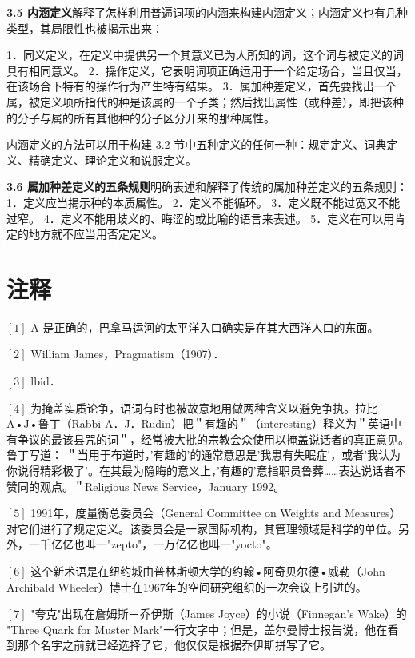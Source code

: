 \begin{center}
{{\textbf{3.5 内涵定义}解释了怎样利用普遍词项的内涵来构建内涵定义；内涵定义也有几种类型，其局限性也被揭示出来：

1．同义定义，在定义中提供另一个其意义已为人所知的词，这个词与被定义的词具有相同意义。
2．操作定义，它表明词项正确运用于一个给定场合，当且仅当，在该场合下特有的操作行为产生特有结果。
3．属加种差定义，首先要找出一个属，被定义项所指代的种是该属的一个子类；然后找出属性（或种差），即把该种的分子与属的所有其他种的分子区分开来的那种属性。

内涵定义的方法可以用于构建 3.2 节中五种定义的任何一种：规定定义、词典定义、精确定义、理论定义和说服定义。

\textbf{3.6 属加种差定义的五条规则}明确表述和解释了传统的属加种差定义的五条规则：
1．定义应当揭示种的本质属性。
2．定义不能循环。
3．定义既不能过宽又不能过窄。
4．定义不能用歧义的、䀲涩的或比喻的语言来表述。
5．定义在可以用肯定的地方就不应当用否定定义。
}}
\end{center}

\section{注释}

$[1]$ A 是正确的，巴拿马运河的太平洋入口确实是在其大西洋人口的东面。

$[2]$ William James，Pragmatism（1907）．

$[3]$ lbid．

$[4]$ 为掩盖实质论争，语词有时也被故意地用做两种含义以避免争执。拉比－ A•J•鲁丁（Rabbi A．J．Rudin）把＂有趣的＂（interesting）释义为＂英语中有争议的最该县咒的词＂，经常被大批的宗教会众使用以掩盖说话者的真正意见。鲁丁写道： ＂当用于布道时，'有趣的'的通常意思是'我患有失眠症'，或者'我认为你说得精彩极了'。在其最为隐䀲的意义上，'有趣的'意指职员鲁葬……表达说话者不赞同的观点。＂Religious News Service，January 1992。

$[5]$ 1991年，度量衡总委员会（General Committee on Weights and Measures）对它们进行了规定定义。该委员会是一家国际机构，其管理领域是科学的单位。另外，一千亿亿也叫一"zepto"，一万亿亿也叫一"yocto"。

$[6]$ 这个新术语是在纽约城由普林斯顿大学的约翰•阿奇贝尔德•威勒（John Archibald Wheeler）博士在1967年的空间研究组织的一次会议上引进的。

$[7]$ "夸克"出现在詹姆斯－乔伊斯（James Joyce）的小说（Finnegan's Wake）的 "Three Quark for Muster Mark"一行文字中；但是，盖尔曼博士报告说，他在看到那个名字之前就已经选择了它，他仅仅是根据乔伊斯拼写了它。

